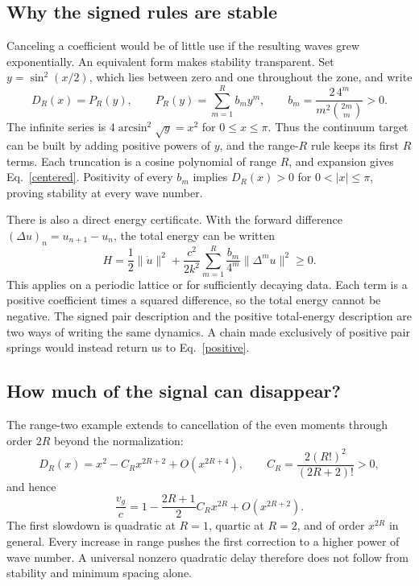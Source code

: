 \documentclass[11pt]{article}
\begin{document}
\subsection{Why the signed rules are stable}
Canceling a coefficient would be of little use if the resulting waves grew exponentially. An equivalent form makes stability transparent. Set $y=\sin^2(x/2)$, which lies between zero and one throughout the zone, and write
\begin{equation}\label{poly}
 D_R(x)=P_R(y),\qquad
 P_R(y)=\sum_{m=1}^R b_m y^m,\qquad
 b_m=\frac{2\,4^m}{m^2\binom{2m}{m}}>0.
\end{equation}
The infinite series is $4\arcsin^2\sqrt y=x^2$ for $0\leq x\leq\pi$. Thus the continuum target can be built by adding positive powers of $y$, and the range-$R$ rule keeps its first $R$ terms. Each truncation is a cosine polynomial of range $R$, and expansion gives Eq.~\eqref{centered}. Positivity of every $b_m$ implies $D_R(x)>0$ for $0<|x|\leq\pi$, proving stability at every wave number.

There is also a direct energy certificate. With the forward difference $(\Delta u)_n=u_{n+1}-u_n$, the total energy can be written
\begin{equation}
 H=\frac12\|\dot u\|^2+
 \frac{c^2}{2k^2}\sum_{m=1}^R\frac{b_m}{4^m}\|\Delta^m u\|^2\geq0.
\end{equation}
This applies on a periodic lattice or for sufficiently decaying data. Each term is a positive coefficient times a squared difference, so the total energy cannot be negative. The signed pair description and the positive total-energy description are two ways of writing the same dynamics. A chain made exclusively of positive pair springs would instead return us to Eq.~\eqref{positive}.

\subsection{How much of the signal can disappear?}
The range-two example extends to cancellation of the even moments through order $2R$ beyond the normalization:
\begin{equation}
 D_R(x)=x^2-C_Rx^{2R+2}+O(x^{2R+4}),\qquad
 C_R=\frac{2(R!)^2}{(2R+2)!}>0,
\end{equation}
and hence
\begin{equation}\label{grouporder}
 \frac{v_g}{c}=1-\frac{2R+1}{2}C_Rx^{2R}+O(x^{2R+2}).
\end{equation}
The first slowdown is quadratic at $R=1$, quartic at $R=2$, and of order $x^{2R}$ in general. Every increase in range pushes the first correction to a higher power of wave number. A universal nonzero quadratic delay therefore does not follow from stability and minimum spacing alone.
\end{document}
